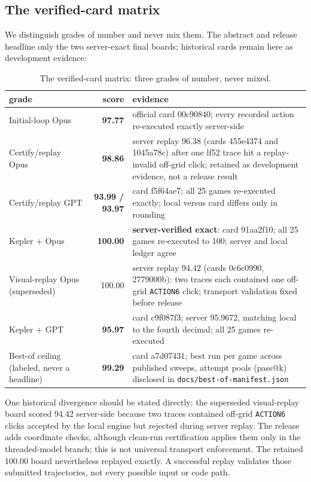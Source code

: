 \documentclass[11pt]{article}
\begin{document}
\subsection{The verified-card matrix}\label{sec:matrix}

We distinguish grades of number and never mix them. The abstract and release headline only the two server-exact final boards; historical cards remain here as development evidence:

\begin{table}[ht]
  \centering
  \caption{The verified-card matrix: three grades of number, never mixed.}
  \label{tab:matrix}
  \small
  \begin{tabular}{p{3.6cm}rp{8.2cm}}
    \toprule
    grade & score & evidence \\
    \midrule
    Initial-loop Opus & \textbf{97.77} & official card 00c90840; every recorded action re-executed exactly server-side \\
    \addlinespace
    Certify/replay Opus & \textbf{98.86} & server replay 96.38 (cards 455e4374 and 1045a78c) after one lf52 trace hit a replay-invalid off-grid click; retained as development evidence, not a release result \\
    \addlinespace
    Certify/replay GPT & \textbf{93.99 / 93.97} & card f5f64ae7; all 25 games re-executed exactly; local versus card differs only in rounding \\
    \addlinespace
    Kepler + Opus & \textbf{100.00} & \textbf{server-verified exact}: card 91aa2f10; all 25 games re-executed to 100; server and local ledger agree \\
    \addlinespace
    Visual-replay Opus (superseded) & 100.00 & server replay 94.42 (cards 0c6c0990, 2779000b): two traces each contained one off-grid \texttt{ACTION6} click; transport validation fixed before release \\
    \addlinespace
    Kepler + GPT & \textbf{95.97} & card c9f087f3; server 95.9672, matching local to the fourth decimal; all 25 games re-executed \\
    \addlinespace
    Best-of ceiling (labeled, never a headline) & \textbf{99.29} & card a7d07431; best run per game across published sweeps, attempt pools (pass@k) disclosed in \texttt{docs/best-of-manifest.json} \\
    \bottomrule
  \end{tabular}
\end{table}

One historical divergence should be stated directly: the superseded visual-replay board scored 94.42 server-side because two traces contained off-grid \texttt{ACTION6} clicks accepted by the local engine but rejected during server replay. The release adds coordinate checks, although clean-run certification applies them only in the threaded-model branch; this is not universal transport enforcement. The retained 100.00 board nevertheless replayed exactly. A successful replay validates those submitted trajectories, not every possible input or code path.
\end{document}
